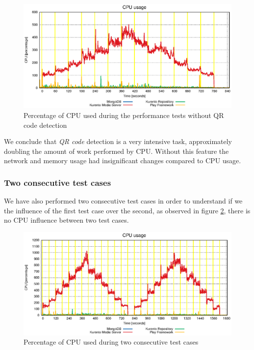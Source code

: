 \begin{figure}[!htb]
  \centering
  \includegraphics[width=\textwidth]{stats/test_without_qrcode_cpu.eps}
  \caption{Percentage of CPU used during the performance tests without QR code detection}
  \label{fig:test_without_qrcode_cpu}
\end{figure}

We conclude that \emph{QR code} detection is a very intensive task, approximately doubling the amount of work performed by \ac{CPU}. Without this feature the network and memory usage had insignificant changes compared to \ac{CPU} usage.

\subsubsection{Two consecutive test cases}


We have also performed two consecutive test cases in order to understand if we the influence of the first test case over the second, as observed in figure \ref{fig:test_two_times_cpu}, there is no \ac{CPU} influence between two test cases.


\begin{figure}[!htb]
  \centering
  \includegraphics[width=\textwidth]{stats/test_two_times_cpu.eps}
  \caption{Percentage of CPU used during two consecutive test cases}
  \label{fig:test_two_times_cpu}
\end{figure}

